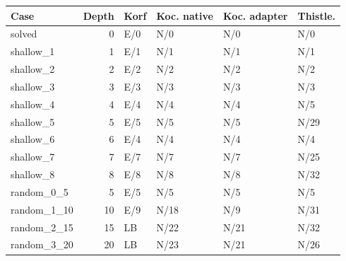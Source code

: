 \begin{tabular}{p{}rllll}
\hline
Case & Depth & Korf & Koc. native & Koc. adapter & Thistle. \\
\hline
solved & 0 & E/0 & N/0 & N/0 & N/0 \\
shallow\_1 & 1 & E/1 & N/1 & N/1 & N/1 \\
shallow\_2 & 2 & E/2 & N/2 & N/2 & N/2 \\
shallow\_3 & 3 & E/3 & N/3 & N/3 & N/3 \\
shallow\_4 & 4 & E/4 & N/4 & N/4 & N/5 \\
shallow\_5 & 5 & E/5 & N/5 & N/5 & N/29 \\
shallow\_6 & 6 & E/4 & N/4 & N/4 & N/4 \\
shallow\_7 & 7 & E/7 & N/7 & N/7 & N/25 \\
shallow\_8 & 8 & E/8 & N/8 & N/8 & N/32 \\
random\_0\_5 & 5 & E/5 & N/5 & N/5 & N/5 \\
random\_1\_10 & 10 & E/9 & N/18 & N/9 & N/31 \\
random\_2\_15 & 15 & LB & N/22 & N/21 & N/32 \\
random\_3\_20 & 20 & LB & N/23 & N/21 & N/26 \\
\hline
\end{tabular}
